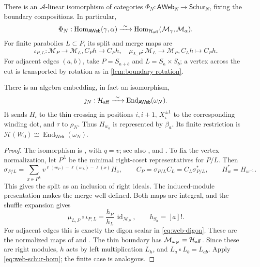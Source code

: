 \documentclass[a4paper,11pt]{amsart}
\numberwithin{equation}{subsection}
\theoremstyle{plain}
\theoremstyle{definition}
\theoremstyle{remark}
\newcommand{\Hom}{\operatorname{Hom}}
\begin{document}
\begin{lemma}\label{lem:vertex-normalization}
There is an $\mathcal A$-linear isomorphism of categories
$\Phi_N:\mathsf{AWeb}_N\to\mathsf{Schur}_N$, fixing the
boundary compositions. In particular,
\begin{gather}\label{eq:web-schur-hom}
\Phi_N:\Hom_{\mathsf{AWeb}}(\gamma,\alpha)
\xrightarrow{\ \sim\ }
\Hom_{\mathcal H_{\rm aff}}(\mathcal M_\gamma,\mathcal M_\alpha).
\end{gather}
For finite parabolics $L\subset P$, its split and merge maps are
\[
\iota_{P,L}:\mathcal M_P\longrightarrow\mathcal M_L,
C_Ph\longmapsto C_Ph,\quad
\mu_{L,P}:\mathcal M_L\longrightarrow\mathcal M_P,
C_Lh\longmapsto C_Ph.
\]
For adjacent edges $(a,b)$, take $P=S_{a+b}$ and
$L=S_a\times S_b$; a vertex across the cut is transported
by rotation as in \autoref{lem:boundary-rotation}.

There is an algebra embedding, in fact an isomorphism,
\begin{gather}\label{eq:hecke-web-embedding}
\jmath_N:\mathcal H_{\rm aff}
\xrightarrow{\ \sim\ }\operatorname{End}_{\mathsf{AWeb}}(\omega_N).
\end{gather}
It sends $H_i$ to the thin crossing in positions $i,i+1$,
$X_i^{\pm1}$ to the corresponding winding dot, and $\tau$ to
$\rho_N$. Thus $H_{w_a}$ is represented by $\beta_a$.
Its finite restriction is
$\mathcal H(W_0)\cong\operatorname{End}_{\mathsf{Web}}(\omega_N)$.
\end{lemma}

\begin{proof}
The isomorphism is
\cite[Theorem~4.16, Proposition~4.18(1)]{SSW}, with $q=v$;
see also \cite{GreenAffine}, \cite[Theorem~3.22]{TVW}
and \cite{Brundan}. To fix the vertex normalization, let
$P^L$ be the minimal right-coset representatives for $P/L$.
Then
\[
\sigma_{P/L}=\sum_{x\in P^L}
v^{\ell(w_P)-\ell(w_L)-\ell(x)}H_x,\qquad
C_P=\sigma_{P/L}C_L=C_L\sigma_{P/L}^{*},
\qquad H_w^*=H_{w^{-1}}.
\]
This gives the split as an inclusion of right ideals.
The induced-module presentation makes the merge well-defined.
Both maps are integral, and the shuffle expansion gives
\[
\mu_{L,P}\circ\iota_{P,L}
=\frac{h_P}{h_L}\,\operatorname{id}_{\mathcal M_P},
\qquad h_{S_a}=[a]!.
\]
For adjacent edges this is exactly the digon scalar in
\autoref{eq:web-digon}. These are the normalized maps of
\cite{TVW,LatifiTubbenhauer} and \cite[(3.21)--(3.22)]{SSW}.
The thin boundary has $\mathcal M_{\omega_N}=\mathcal H_{\rm aff}$.
Since these are right modules, $h$ acts by left multiplication
$L_h$, and $L_a\circ L_b=L_{ab}$.
Apply \autoref{eq:web-schur-hom}; the finite case is analogous.
\end{proof}
\end{document}
